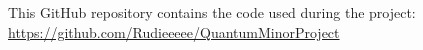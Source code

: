 This GitHub repository contains the code used during the project: \url{https://github.com/Rudieeeee/QuantumMinorProject}